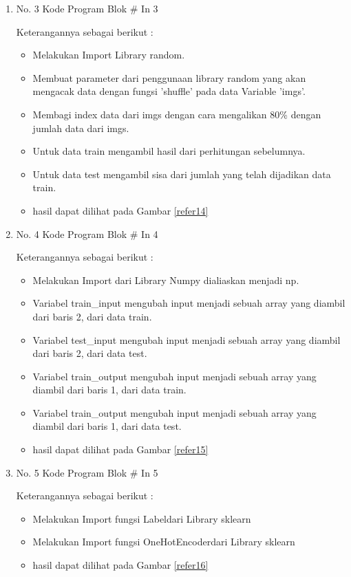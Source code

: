 \begin{enumerate}
\item No. 3 Kode Program Blok \# In 3
\par 
Keterangannya sebagai berikut :
\begin{itemize}
\item Melakukan Import Library random.
\item Membuat parameter dari penggunaan library random yang akan mengacak data dengan fungsi 'shuffle' pada data Variable 'imgs'.
\item Membagi index data dari imgs dengan cara mengalikan 80\% dengan jumlah data dari imgs.
\item Untuk data train mengambil hasil dari perhitungan sebelumnya.
\item Untuk data test mengambil sisa dari jumlah yang telah dijadikan data train.
\item hasil dapat dilihat pada Gambar \ref{refer14}
\end{itemize}


\item No. 4 Kode Program Blok \# In 4
\par 
Keterangannya sebagai berikut :
\begin{itemize}
\item Melakukan Import dari Library Numpy dialiaskan menjadi np.
\item Variabel train\_input mengubah input menjadi sebuah array yang diambil dari baris 2, dari data train.
\item Variabel test\_input mengubah input menjadi sebuah array yang diambil dari baris 2, dari data test.
\item Variabel train\_output mengubah input menjadi sebuah array yang diambil dari baris 1, dari data train.
\item Variabel train\_output mengubah input menjadi sebuah array yang diambil dari baris 1, dari data test.
\item hasil dapat dilihat pada Gambar \ref{refer15}
\end{itemize}



\item No. 5 Kode Program Blok \# In 5
\par 
Keterangannya sebagai berikut :
\begin{itemize}
\item Melakukan Import fungsi Labeldari Library sklearn 
\item Melakukan Import fungsi OneHotEncoderdari Library sklearn
\item hasil dapat dilihat pada Gambar \ref{refer16}
\end{itemize}




\end{enumerate}
